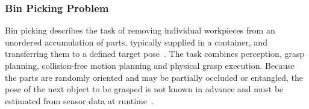

\subsubsection{Bin Picking Problem}
\label{subsubsec:bin_picking}

Bin picking describes the task of removing individual workpieces from an unordered accumulation of parts, typically supplied in a container, and
transferring them to a defined target pose~\cite{Khalid2021Automatic,Kyprianou2023Bin-Picking}. The task combines perception, grasp planning,
collision-free motion planning and physical grasp execution. Because the parts are randomly oriented and may be partially occluded or entangled, the
pose of the next object to be grasped is not known in advance and must be estimated from sensor data at runtime~\cite{Zhang2021A,Tipary2021Planning}.

